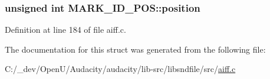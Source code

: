 \subsubsection[{\texorpdfstring{position}{position}}]{\setlength{\rightskip}{0pt plus 5cm}unsigned {\bf int} M\+A\+R\+K\+\_\+\+I\+D\+\_\+\+P\+O\+S\+::position}\hypertarget{struct_m_a_r_k___i_d___p_o_s_ab2bc7ea9aefff777f0fc3eff19d45f87}{}\label{struct_m_a_r_k___i_d___p_o_s_ab2bc7ea9aefff777f0fc3eff19d45f87}


Definition at line 184 of file aiff.\+c.



The documentation for this struct was generated from the following file\+:\begin{DoxyCompactItemize}
\item 
C\+:/\+\_\+dev/\+Open\+U/\+Audacity/audacity/lib-\/src/libsndfile/src/\hyperlink{aiff_8c}{aiff.\+c}\end{DoxyCompactItemize}

